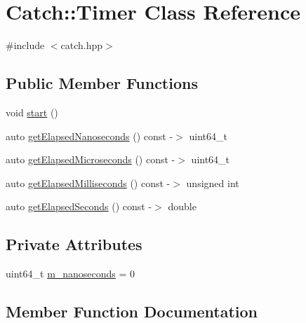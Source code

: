 \hypertarget{class_catch_1_1_timer}{}\section{Catch\+::Timer Class Reference}
\label{class_catch_1_1_timer}


{\ttfamily \#include $<$catch.\+hpp$>$}

\subsection*{Public Member Functions}
\begin{DoxyCompactItemize}
\item 
void \mbox{\hyperlink{class_catch_1_1_timer_a0a56e879e43f36c102bf9ea8b5fc8b72}{start}} ()
\item 
auto \mbox{\hyperlink{class_catch_1_1_timer_a57be5d17ca868a2d6fb1eea84de665cf}{get\+Elapsed\+Nanoseconds}} () const -\/$>$ uint64\+\_\+t
\item 
auto \mbox{\hyperlink{class_catch_1_1_timer_a545de17a61a6fee1dbe3de5b0723e5fa}{get\+Elapsed\+Microseconds}} () const -\/$>$ uint64\+\_\+t
\item 
auto \mbox{\hyperlink{class_catch_1_1_timer_a30aaf458dbb59dd8ac8971c9c62e0eac}{get\+Elapsed\+Milliseconds}} () const -\/$>$ unsigned int
\item 
auto \mbox{\hyperlink{class_catch_1_1_timer_a065e37e3c9eb16bd4dcf41971d8deedc}{get\+Elapsed\+Seconds}} () const -\/$>$ double
\end{DoxyCompactItemize}
\subsection*{Private Attributes}
\begin{DoxyCompactItemize}
\item 
uint64\+\_\+t \mbox{\hyperlink{class_catch_1_1_timer_ac13c1ef867cc3b9f942032d5ed79c2a7}{m\+\_\+nanoseconds}} = 0
\end{DoxyCompactItemize}


\subsection{Member Function Documentation}
\mbox{\label{class_catch_1_1_timer_a545de17a61a6fee1dbe3de5b0723e5fa}} 
